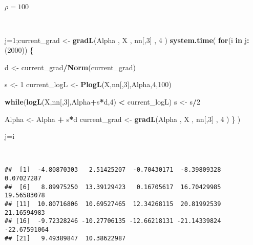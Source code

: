 \documentclass[]{article}
\newenvironment{Shaded}{\begin{snugshade}}{\end{snugshade}}
\newcommand{\KeywordTok}[1]{\textcolor[rgb]{0.13,0.29,0.53}{\textbf{#1}}}
\newcommand{\DecValTok}[1]{\textcolor[rgb]{0.00,0.00,0.81}{#1}}
\newcommand{\StringTok}[1]{\textcolor[rgb]{0.31,0.60,0.02}{#1}}
\newcommand{\ControlFlowTok}[1]{\textcolor[rgb]{0.13,0.29,0.53}{\textbf{#1}}}
\newcommand{\OperatorTok}[1]{\textcolor[rgb]{0.81,0.36,0.00}{\textbf{#1}}}
\newcommand{\NormalTok}[1]{#1}
\begin{document}
\hfil {\Large $\rho = 100$}

~

\begin{Shaded}
\begin{Highlighting}[]
\NormalTok{j=}\DecValTok{1}\NormalTok{;current_grad <-}\StringTok{ }\KeywordTok{gradL}\NormalTok{(Alpha , X , nn[,}\DecValTok{3}\NormalTok{] , }\DecValTok{4}\NormalTok{ ) }
\KeywordTok{system.time}\NormalTok{(}
 \ControlFlowTok{for}\NormalTok{(i }\ControlFlowTok{in}\NormalTok{ j}\OperatorTok{:}\NormalTok{(}\DecValTok{2000}\NormalTok{)) \{}

\NormalTok{    d <-}\StringTok{ }\NormalTok{current_grad}\OperatorTok{/}\KeywordTok{Norm}\NormalTok{(current_grad)    }
    
\NormalTok{    s <-}\StringTok{ }\DecValTok{1} 
\NormalTok{    current_logL <-}\StringTok{ }\KeywordTok{PlogL}\NormalTok{(X,nn[,}\DecValTok{3}\NormalTok{],Alpha,}\DecValTok{4}\NormalTok{,}\DecValTok{100}\NormalTok{)}
    
    \ControlFlowTok{while}\NormalTok{(}\KeywordTok{logL}\NormalTok{(X,nn[,}\DecValTok{3}\NormalTok{],Alpha}\OperatorTok{+}\NormalTok{s}\OperatorTok{*}\NormalTok{d,}\DecValTok{4}\NormalTok{)  }\OperatorTok{<}\StringTok{ }\NormalTok{current_logL)}
\NormalTok{         s <-}\StringTok{ }\NormalTok{s}\OperatorTok{/}\DecValTok{2} 

\NormalTok{    Alpha <-}\StringTok{ }\NormalTok{Alpha }\OperatorTok{+}\StringTok{ }\NormalTok{s}\OperatorTok{*}\NormalTok{d}
\NormalTok{    current_grad <-}\StringTok{  }\KeywordTok{gradL}\NormalTok{(Alpha , X , nn[,}\DecValTok{3}\NormalTok{] , }\DecValTok{4}\NormalTok{ ) \} )}


\NormalTok{j=i}
\end{Highlighting}
\end{Shaded}

~

\begin{verbatim}
##  [1]  -4.80870303   2.51425207  -0.70430171  -8.39809328   0.07027287
##  [6]   8.89975250  13.39129423   0.16705617  16.70429985  19.56583078
## [11]  10.80716806  10.69527465  12.34268115  20.81992539  21.16594983
## [16]  -9.72328246 -10.27706135 -12.66218131 -21.14339824 -22.67591064
## [21]   9.49389847  10.38622987
\end{verbatim}
\end{document}
